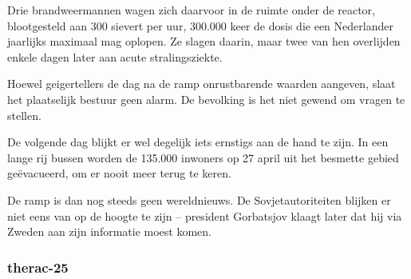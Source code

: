 Drie brandweermannen wagen zich daarvoor in de ruimte onder de reactor, blootgesteld aan 300 sievert per uur, 300.000 keer de dosis die een Nederlander jaarlijks maximaal mag oplopen. Ze slagen daarin, maar twee van hen overlijden enkele dagen later aan acute stralingsziekte.

Hoewel geigertellers de dag na de ramp onrustbarende waarden aangeven, slaat het plaatselijk bestuur geen alarm. De bevolking is het niet gewend om vragen te stellen.

De volgende dag blijkt er wel degelijk iets ernstigs aan de hand te zijn. In een lange rij bussen worden de 135.000 inwoners op 27 april uit het besmette gebied geëvacueerd, om er nooit meer terug te keren.

De ramp is dan nog steeds geen wereldnieuws. De Sovjetautoriteiten blijken er niet eens van op de hoogte te zijn – president Gorbatsjov klaagt later dat hij via Zweden aan zijn informatie moest komen.



\cite{verschuur14012013tjernobylreports}

\cite{paperlessarchivesTjernobyl}

\cite{vargos082000tjernobylconcerns}

\cite{mauroNuclearRiskSociety}

\cite{vienna06092005LookingBack}

\subsubsection{therac-25}

